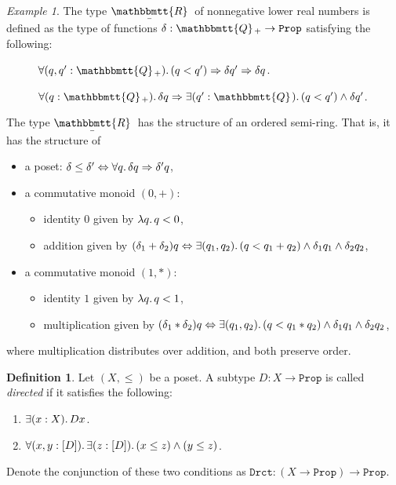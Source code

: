 \documentclass[11pt, oneside, article]{memoir}
\theoremstyle{plain}
\theoremstyle{definition}
\newtheorem{definition}[theorem]{Definition}
\theoremstyle{remark}
\newtheorem{example}[theorem]{Example}
\DeclarePairedDelimiter{\subtype}{[}{]}
\newcommand{\const}[1]{\mathtt{#1}}
\newcommand{\ubar}[1]{\underaccent{\bar}{#1}}
\newcommand{\internal}[1]{\raisebox{-.03ex}{$\mathbbmtt{#1}$}}
\newcommand{\hs}{\hspace{1.1pt}}
\newcommand{\tQQ}{\internal{Q}\hs}
\newcommand{\tQQp}{\tQQ_{+}}
\newcommand{\tRR}{\internal{R}\hs}
\newcommand{\tLR}{\ubar{\tRR}\hs}
\newcommand{\Prop}{\const{Prop}}
\newcommand{\imp}{\Rightarrow}
\renewcommand{\iff}{\Leftrightarrow}
\begin{document}
\begin{example}
The type $\tLR$ of nonnegative lower real numbers is defined as the type of functions $\delta:\tQQp\to\Prop$ satisfying the following:
\begin{description}
	\item[\quad\parbox{1in}{Down-closed:}] $\forall(q,q':\tQQp)\ldotp (q<q')\imp\delta q'\imp\delta q$.
	\item[\quad\parbox{1in}{Rounded:}] $\forall(q:\tQQp)\ldotp\delta q\imp\exists(q':\tQQ)\ldotp(q<q')\wedge\delta q'$.
\end{description}
The type $\tLR$ has the structure of an ordered semi-ring. That is, it has the structure of
\begin{itemize}
	\item a poset: $\delta\leq \delta'\iff\forall q\ldotp\delta q\imp\delta'q$,
	\item a commutative monoid $(0,+)$:
	\begin{itemize}
		\item identity $0$ given by $\lambda q\ldotp q < 0$,
		\item  addition given by $(\delta_1+\delta_2)q\iff\exists(q_1,q_2)\ldotp(q<q_1+q_2)\wedge\delta_1q_1\wedge\delta_2q_2$,
	\end{itemize}
	\item a commutative monoid $(1,*)$:
	\begin{itemize}
		\item identity $1$ given by $\lambda q\ldotp q<1$,
		\item multiplication given by $(\delta_1*\delta_2)q\iff\exists(q_1,q_2)\ldotp(q<q_1*q_2)\wedge\delta_1q_1\wedge\delta_2q_2$,
	\end{itemize}
\end{itemize}
where multiplication distributes over addition, and both preserve order.
\end{example}

\begin{definition}
Let $(X,\leq)$ be a poset. A subtype $D:X\to\Prop$ is called \emph{directed} if it satisfies the following:
\begin{enumerate}
	\item $\exists(x:X)\ldotp Dx$.
	\item $\forall(x,y:\subtype{D})\ldotp\exists(z:\subtype{D})\ldotp(x\leq z)\wedge (y\leq z)$.
\end{enumerate}
Denote the conjunction of these two conditions as $\const{Drct}:(X\to\Prop)\to\Prop$.
\end{definition}
\end{document}
